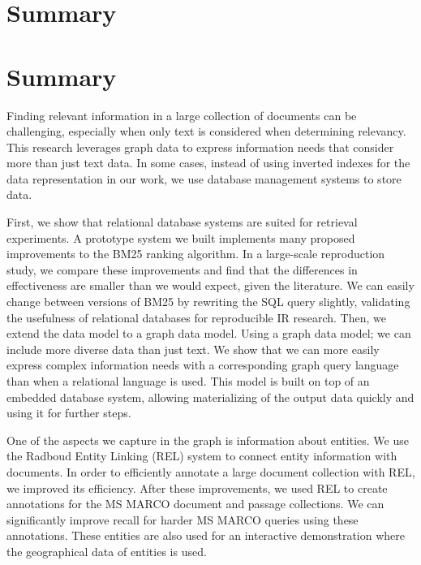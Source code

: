 \chapter*{Summary}

\chapter*{Summary}

Finding relevant information in a large collection of documents can be challenging, especially when only text is considered when determining relevancy. This research leverages graph data to express information needs that consider more than just text data. In some cases, instead of using inverted indexes for the data representation in our work, we use database management systems to store data.

First, we show that relational database systems are suited for retrieval experiments. A prototype system we built implements many proposed improvements to the BM25 ranking algorithm. In a large-scale reproduction study, we compare these improvements and find that the differences in effectiveness are smaller than we would expect, given the literature. We can easily change between versions of BM25 by rewriting the SQL query slightly, validating the usefulness of relational databases for reproducible IR research. 
Then, we extend the data model to a graph data model. Using a graph data model; we can include more diverse data than just text. We show that we can more easily express complex information needs with a corresponding graph query language than when a relational language is used. This model is built on top of an embedded database system, allowing materializing of the output data quickly and using it for further steps.

One of the aspects we capture in the graph is information about entities. We use the Radboud Entity Linking (REL) system to connect entity information with documents. In order to efficiently annotate a large document collection with REL, we improved its efficiency. After these improvements, we used REL to create annotations for the MS MARCO document and passage collections. We can significantly improve recall for harder MS MARCO queries using these annotations. These entities are also used for an interactive demonstration where the geographical data of entities is used.


